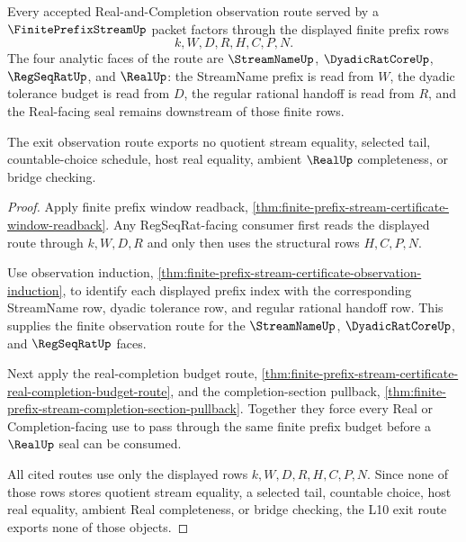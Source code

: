 \begin{theorem}
\label{thm:finite-prefix-stream-l10-exit-observation-route}
Every accepted Real-and-Completion observation route served by a $\FinitePrefixStreamUp$ packet factors through the displayed finite prefix rows
$$
k,W,D,R,H,C,P,N .
$$
The four analytic faces of the route are $\StreamNameUp$, $\DyadicRatCoreUp$, $\RegSeqRatUp$, and $\RealUp$: the StreamName prefix is read from $W$, the dyadic tolerance budget is read from $D$, the regular rational handoff is read from $R$, and the Real-facing seal remains downstream of those finite rows.

The exit observation route exports no quotient stream equality, selected tail, countable-choice schedule, host real equality, ambient $\RealUp$ completeness, or bridge checking.
\end{theorem}
\begin{proof}
Apply finite prefix window readback, \autoref{thm:finite-prefix-stream-certificate-window-readback}. Any RegSeqRat-facing consumer first reads the displayed route through $k,W,D,R$ and only then uses the structural rows $H,C,P,N$.

Use observation induction, \autoref{thm:finite-prefix-stream-certificate-observation-induction}, to identify each displayed prefix index with the corresponding StreamName row, dyadic tolerance row, and regular rational handoff row. This supplies the finite observation route for the $\StreamNameUp$, $\DyadicRatCoreUp$, and $\RegSeqRatUp$ faces.

Next apply the real-completion budget route, \autoref{thm:finite-prefix-stream-certificate-real-completion-budget-route}, and the completion-section pullback, \autoref{thm:finite-prefix-stream-completion-section-pullback}. Together they force every Real or Completion-facing use to pass through the same finite prefix budget before a $\RealUp$ seal can be consumed.

All cited routes use only the displayed rows $k,W,D,R,H,C,P,N$. Since none of those rows stores quotient stream equality, a selected tail, countable choice, host real equality, ambient Real completeness, or bridge checking, the L10 exit route exports none of those objects.
\end{proof}


